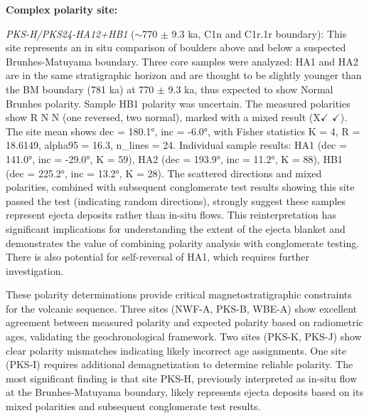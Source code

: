 \documentclass[twocolumn,11pt]{article}
\begin{document}
\textbf{Complex polarity site:}

\textit{PKS-H/PKS24-HA12+HB1} ($\sim$770 $\pm$ 9.3 ka, C1n and C1r.1r boundary): This site represents an in situ comparison of boulders above and below a suspected Brunhes-Matuyama boundary. Three core samples were analyzed: HA1 and HA2 are in the same stratigraphic horizon and are thought to be slightly younger than the BM boundary (781 ka) at 770 $\pm$ 9.3 ka, thus expected to show Normal Brunhes polarity. Sample HB1 polarity was uncertain. The measured polarities show R N N (one reversed, two normal), marked with a mixed result (X$\checkmark$ $\checkmark$). The site mean shows dec = 180.1°, inc = -6.0°, with Fisher statistics K = 4, R = 18.6149, alpha95 = 16.3, n\_lines = 24. Individual sample results: HA1 (dec = 141.0°, inc = -29.0°, K = 59), HA2 (dec = 193.9°, inc = 11.2°, K = 88), HB1 (dec = 225.2°, inc = 13.2°, K = 28). The scattered directions and mixed polarities, combined with subsequent conglomerate test results showing this site passed the test (indicating random directions), strongly suggest these samples represent ejecta deposits rather than in-situ flows. This reinterpretation has significant implications for understanding the extent of the ejecta blanket and demonstrates the value of combining polarity analysis with conglomerate testing. There is also potential for self-reversal of HA1, which requires further investigation.

These polarity determinations provide critical magnetostratigraphic constraints for the volcanic sequence. Three sites (NWF-A, PKS-B, WBE-A) show excellent agreement between measured polarity and expected polarity based on radiometric ages, validating the geochronological framework. Two sites (PKS-K, PKS-J) show clear polarity mismatches indicating likely incorrect age assignments. One site (PKS-I) requires additional demagnetization to determine reliable polarity. The most significant finding is that site PKS-H, previously interpreted as in-situ flow at the Brunhes-Matuyama boundary, likely represents ejecta deposits based on its mixed polarities and subsequent conglomerate test results.
\end{document}
